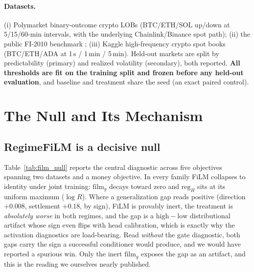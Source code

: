 \documentclass{article}
\begin{document}
\paragraph{Datasets.}
(i) Polymarket binary-outcome crypto LOBs (BTC/ETH/SOL up/down at 5/15/60-min
intervals, with the underlying Chainlink/Binance spot path); (ii) the public
FI-2010 benchmark \citep{ntakaris2018benchmark}; (iii) Kaggle high-frequency crypto
spot books (BTC/ETH/ADA at 1\,s / 1\,min / 5\,min). Held-out markets are split by
predictability (primary) and realized volatility (secondary), both reported.
\textbf{All thresholds are fit on the training split and frozen before any held-out
evaluation}, and baseline and treatment share the seed (an exact paired control).

\section{The Null and Its Mechanism}\label{sec:mechanism}

\subsection{RegimeFiLM is a decisive null}\label{sec:null}

Table~\ref{tab:film_null} reports the central diagnostic across five objectives
spanning two datasets and a money objective. In every family FiLM collapses to
identity under joint training: $\mathrm{film}_g$ decays toward zero and
$\mathrm{reg}_H$ sits at its uniform maximum ($\log R$). Where a generalization gap
reads positive (direction $+0.008$, settlement $+0.18$, by sign), FiLM is provably
inert, the treatment is \emph{absolutely worse} in both regimes, and the gap is a
$\mathrm{high}-\mathrm{low}$ distributional artifact whose sign even flips with head
calibration, which is exactly why the activation diagnostics are load-bearing. Read
\emph{without} the gate diagnostic, both gaps carry the sign a successful
conditioner would produce, and we would have reported a spurious win. Only the inert
$\mathrm{film}_g$ exposes the gap as an artifact, and this is the reading we
ourselves nearly published.
\end{document}
